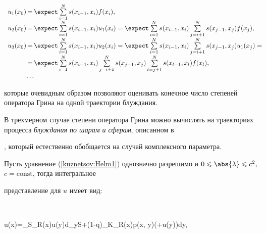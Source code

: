 \begin{equation}\label{kuznetsov:walkOnBalls}

\begin{array}{rcl}

    u_1(x_0)&\!\!\!\!\!\!=\!\!\!\!\!\!&\expect\sum\limits_{i=1}^{N}s(x_{i-1},  x_{i})f(x_i), \\

    u_2(x_0)&\!\!\!\!\!\!=\!\!\!\!\!\!&\expect\sum\limits_{i=1}^{N}s(x_{i-1},  x_{i})u_1(x_i)=\expect\sum\limits_{i=1}^{N}s(x_{i-1},  x_{i})\sum\limits_{j=i+1}^{N}s(x_{j-1},

x_{j})f(x_j), \hspace{-15mm} \\

    u_3(x_0)&\!\!\!\!\!\!=\!\!\!\!\!\!&\expect\sum\limits_{i=1}^{N}s(x_{i-1},  x_{i})u_2(x_i)=\expect\sum\limits_{i=1}^{N}s(x_{i-1},  x_{i})\sum\limits_{j=i+1}^{N}s(x_{j-1},

x_{j})u_1(x_j)= \hspace{-4mm}\\

    &\!\!\!\!\!\!=\!\!\!\!\!\!&\expect\sum\limits_{i=1}^{N}s(x_{i-1},  x_{i})\sum\limits_{j=i+1}^{N}s(x_{j-1},  x_{j})\sum\limits_{l=j+1}^{N}s(x_{l-1},  x_{l})f(x_l), \\

    &\!\!\!\!\!\!\ldots\!\!\!\!\!\!&\\

\end{array}

\end{equation}

которые очевидным образом позволяют оценивать конечное число степеней оператора Грина на одной траектории блуждания.



В трехмерном случае степени оператора Грина можно вычислять на траекториях процесса \emph{блуждания по шарам и сферам},  описанном в

\cite{kuznetsov:ENS},  который естественно обобщается на случай комплексного параметра.



   Пусть уравнение (\ref{kuznetsov:Helm1}) однозначно разрешимо и $0\leqslant\abs{\lambda}\leqslant c^2, $ $c=\mathrm{const}$,  тогда интегральное

представление для $u$ имеет вид:

   $$

       u(x)=\int\limits_{S_{R(x)}}u(y)d_yS+(1-q)\int\limits_{K_{R(x)}}p(x, y)\left(+u(y)\right)dy,

